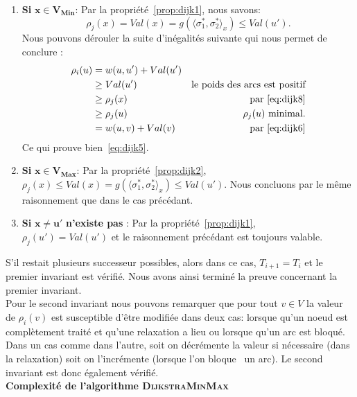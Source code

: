 \begin{enumerate}
\begin{enumerate}
	\item \textbf{Si }$\mathbf{x \in V_{Min}}$: Par la propriété~\ref{prop:dijk1}, nous savons:
	 \begin{equation}
		\label{eq:dijk8}\rho_j(x) = Val(x) = g(\langle \sigma_1^*, \sigma_2^* \rangle_x) \leq Val(u') .
	\end{equation}
	Nous pouvons dérouler la suite d'inégalités suivante qui nous permet de conclure : 
	\begin{align*}
		\rho_i(u) &= w(u,u') + Val(u')\\
		 		  &\geq Val(u') & \text{le poids des arcs est positif} \\
				  &\geq \rho_j(x) & \text{par}~\eqref{eq:dijk8} \\
				  &\geq \rho_j(u) &  \rho_j(u) \text{ minimal.}\\
				  &= w(u,v) + Val(v) & \text{par}~\eqref{eq:dijk6}						
	\end{align*}
	Ce qui prouve bien~\eqref{eq:dijk5}.
	\item \textbf{Si }$\mathbf{x \in V_{Max}}$:	 Par la propriété~\ref{prop:dijk2},\\ $\rho_j(x) \leq Val(x) = g(\langle \sigma_1^*, \sigma_2^* \rangle_x) \leq Val(u') $. Nous concluons par le même raisonnement que dans le cas précédant.
	\item \textbf{Si }$\mathbf{x \neq u'}$\textbf{ n'existe pas }: Par la propriété~\ref{prop:dijk1},\\ $\rho_j(u') = Val(u')$ et le raisonnement précédant est toujours valable.
\end{enumerate}
\end{enumerate}

S'il restait plusieurs successeur possibles, alors dans ce cas, $T_{i+1} = T_i$ et le premier invariant est vérifié.
Nous avons ainsi terminé la preuve concernant la premier invariant.\\

Pour le second invariant nous pouvons remarquer que pour tout $v \in V$ la valeur de $\rho_i(v)$ est susceptible d'être modifiée dans deux cas:  lorsque qu'un noeud est complètement traité et qu'une relaxation a lieu ou lorsque qu'un arc est bloqué. Dans un cas comme dans l'autre, soit on décrémente la valeur si nécessaire (dans la relaxation) soit on l'incrémente (lorsque l'on \og bloque \fg~un arc). Le second invariant est donc également vérifié. \\

\noindent\textbf{Complexité de l'algorithme \textsc{DijkstraMinMax}}\\

